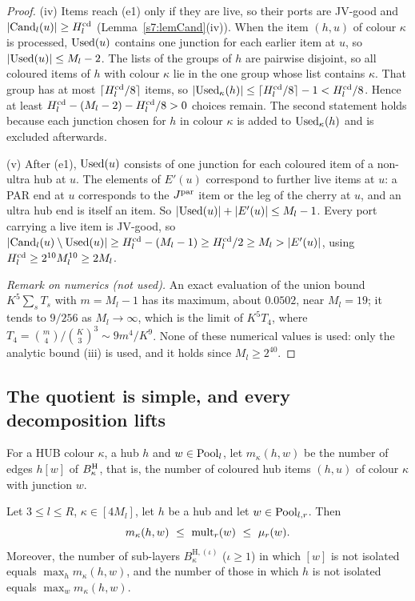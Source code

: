 \begin{proof}
(iv) Items reach (e1) only if they are live, so their ports are JV-good and
$|\mathrm{Cand}_l(u)|\ge H^{\mathrm{cd}}_l$ (Lemma~\ref{s7:lemCand}(iv)). When the item $(h,u)$ of
colour $\kappa$ is processed, $\mathrm{Used}(u)$ contains one junction for each earlier
item at $u$, so $|\mathrm{Used}(u)|\le M_l-2$. The lists of the groups of $h$ are pairwise
disjoint, so all coloured items of $h$ with colour $\kappa$ lie in the one group
whose list contains $\kappa$. That group has at most $\lceil H^{\mathrm{cd}}_l/8\rceil$
items, so $|\mathrm{Used}_\kappa(h)|\le\lceil H^{\mathrm{cd}}_l/8\rceil-1<H^{\mathrm{cd}}_l/8$. Hence at least
$H^{\mathrm{cd}}_l-(M_l-2)-H^{\mathrm{cd}}_l/8>0$ choices remain. The second statement holds because
each junction chosen for $h$ in colour $\kappa$ is added to $\mathrm{Used}_\kappa(h)$
and is excluded afterwards.

(v) After (e1), $\mathrm{Used}(u)$ consists of one junction for each coloured item of a
non-ultra hub at $u$. The elements of $E'(u)$ correspond to further live items at
$u$: a PAR end at $u$ corresponds to the $J^{\mathrm{par}}$ item or the leg of the cherry at
$u$, and an ultra hub end is itself an item. So
$|\mathrm{Used}(u)|+|E'(u)|\le M_l-1$. Every port carrying a live item is JV-good, so
$|\mathrm{Cand}_l(u)\setminus\mathrm{Used}(u)|\ge H^{\mathrm{cd}}_l-(M_l-1)\ge H^{\mathrm{cd}}_l/2\ge M_l>|E'(u)|$,
using $H^{\mathrm{cd}}_l\ge2^{10}M_l^{10}\ge2M_l$.

\emph{Remark on numerics (not used).} An exact evaluation of the union bound
$K^5\sum_sT_s$ with $m=M_l-1$ has its maximum, about $0.0502$, near $M_l=19$;
it tends to $9/256$ as $M_l\to\infty$, which is the limit of $K^5T_4$, where
$T_4=\binom{m}{4}/\binom{K}{3}^3\sim9m^4/K^9$. None of these numerical values is used: only the analytic bound (iii) is
used, and it holds since $M_l\ge2^{40}$.
\end{proof}

\subsection{The quotient is simple, and every decomposition lifts}

For a HUB colour $\kappa$, a hub $h$ and $w\in\mathrm{Pool}_l$, let $m_\kappa(h,w)$ be
the number of edges $h[w]$ of $B^{\mathrm{H}}_\kappa$, that is, the number of coloured hub
items $(h,u)$ of colour $\kappa$ with junction $w$.

\begin{lemma}\label{s7:lemMULT}
Let $3\le l\le R$, $\kappa\in[4M_l]$, let $h$ be a hub and let
$w\in\mathrm{Pool}_{l,r}$. Then
\[
m_\kappa(h,w)\ \le\ \mult_r(w)\ \le\ \mu_r(w).
\]
Moreover, the number of sub-layers $B^{\mathrm{H},(\iota)}_\kappa$ ($\iota\ge1$)
in which $[w]$ is not isolated equals $\max_{h}m_\kappa(h,w)$, and the number of
those in which $h$ is not isolated equals $\max_{w}m_\kappa(h,w)$.
\deps{\ref{s7:consRound}, \ref{s6:lemJplus}, \ref{s7:defCand}, \ref{s7:defPool}, \ref{s2:propOV}}
\end{lemma}

